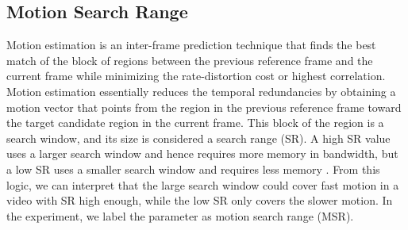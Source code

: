 \subsection{Motion Search Range}
\label{subsec:background/section_c/msr}
Motion estimation is an inter-frame prediction technique that finds the best match of the block of regions between the previous reference frame and the current frame while minimizing the rate-distortion cost or highest correlation. Motion estimation essentially reduces the temporal redundancies by obtaining a motion vector that points from the region in the previous reference frame toward the target candidate region in the current frame. This block of the region is a search window, and its size is considered a search range (SR). A high SR value uses a larger search window and hence requires more memory in bandwidth, but a low SR uses a smaller search window and requires less memory  \cite{lou_adaptive_2010} \cite{bachu_review_2015}. From this logic, we can interpret that the large search window could cover fast motion in a video with SR high enough, while the low SR only covers the slower motion. In the experiment, we label the parameter as motion search range (MSR).
